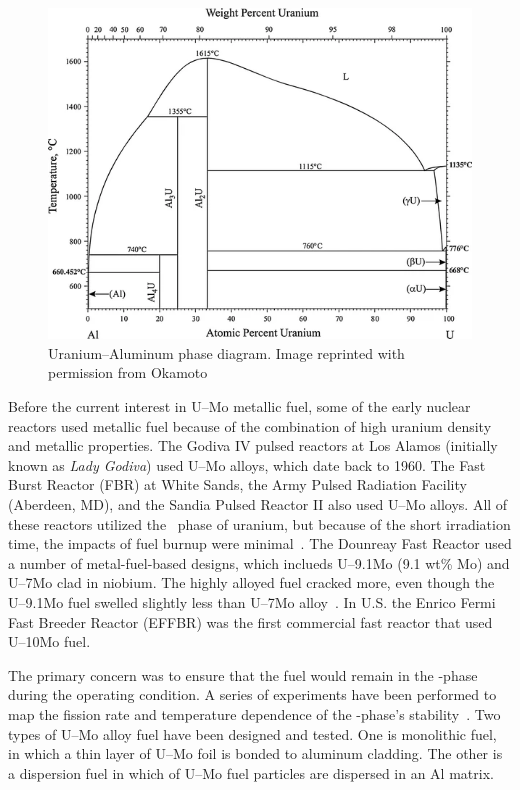 \begin{figure}
\centering
\includegraphics[width=4.25 in]{images/u-al-phase-d.png}
\caption[U--Al phase diagram]{Uranium--Aluminum phase diagram. Image reprinted with permission from Okamoto~\cite{okamoto2012mo}}
\label{fig:ualphase}
\end{figure}



Before the current interest in U--Mo metallic fuel, some of the early nuclear reactors used metallic fuel because of the combination of high uranium density and metallic properties. The Godiva IV pulsed reactors at Los Alamos (initially known as \textit{Lady Godiva}) used U--Mo alloys, which date back to 1960. The Fast Burst Reactor (FBR) at White Sands, the Army Pulsed Radiation Facility (Aberdeen, MD), and the Sandia Pulsed Reactor II also used U--Mo alloys. All of these reactors utilized the \textgamma~phase of uranium, but because of the short irradiation time, the impacts of fuel burnup were minimal~\cite{horak1973operating}. The Dounreay Fast Reactor used a number of metal-fuel-based designs, which inclueds U--9.1Mo (9.1 wt\% Mo) and U--7Mo clad in niobium. The highly alloyed fuel cracked more, even though the U--9.1Mo fuel swelled slightly less than U--7Mo alloy~\cite{cottrell1964development}. In U.S. the Enrico Fermi Fast Breeder Reactor (EFFBR) was the first commercial fast reactor that used U--10Mo fuel. 

The primary concern was to ensure that the fuel would remain in the \textgamma-phase during the operating condition. A series of experiments have been performed to map the fission rate and temperature dependence of the \textgamma-phase's stability~\cite{no20031374}. Two types of U--Mo alloy fuel have been designed and tested. One is monolithic fuel, in which a thin layer of U--Mo foil is bonded to aluminum cladding. The other is a dispersion fuel in which of U--Mo fuel particles are dispersed in an Al matrix.



